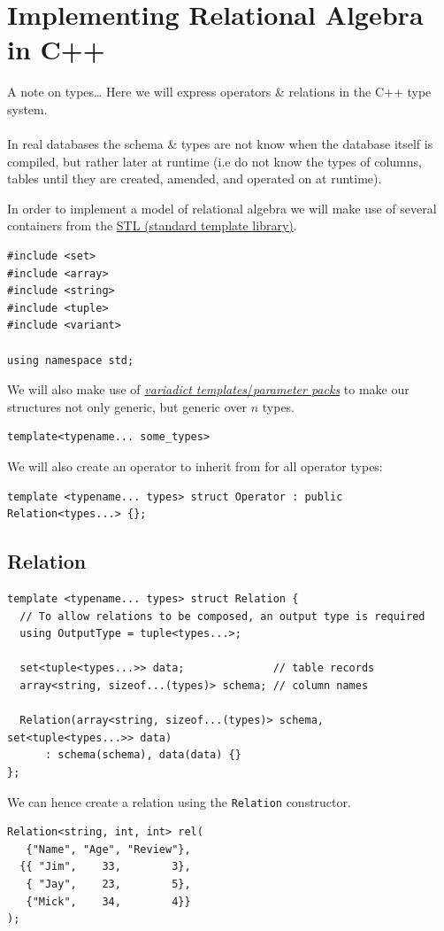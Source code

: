 \section{Implementing Relational Algebra in C++}
\begin{sidenotebox}{A note on types\dots}
  Here we will express operators \& relations in the C++ type system.
  \\
  \\ In real databases the schema \& types are not know when the database itself is compiled, but rather later at runtime (i.e do not know the types of columns, tables until they are created, amended, and operated on at runtime).
\end{sidenotebox}
\noindent
In order to implement a model of relational algebra we will make use of several containers from the
\href{https://en.wikipedia.org/wiki/Standard_Template_Library}{STL (standard template library)}.
\begin{verbatim}
#include <set>
#include <array>
#include <string>
#include <tuple>
#include <variant>

using namespace std;
\end{verbatim}
We will also make use of \href{https://en.cppreference.com/w/cpp/language/parameter_pack}{\textit{variadict templates}/\textit{parameter packs}} to make our structures not only generic, but generic over $n$ types.
\begin{verbatim}
template<typename... some_types>
\end{verbatim}
We will also create an operator to inherit from for all operator types:
\begin{verbatim}
template <typename... types> struct Operator : public Relation<types...> {};
\end{verbatim}

\subsection{Relation}
\begin{verbatim}
template <typename... types> struct Relation {
  // To allow relations to be composed, an output type is required
  using OutputType = tuple<types...>;

  set<tuple<types...>> data;              // table records
  array<string, sizeof...(types)> schema; // column names

  Relation(array<string, sizeof...(types)> schema, set<tuple<types...>> data)
      : schema(schema), data(data) {}
};
\end{verbatim}
\noindent
We can hence create a relation using the \texttt{Relation} constructor.
\begin{verbatim}
Relation<string, int, int> rel(
   {"Name", "Age", "Review"},
  {{ "Jim",    33,        3}, 
   { "Jay",    23,        5}, 
   {"Mick",    34,        4}}
);
\end{verbatim}

